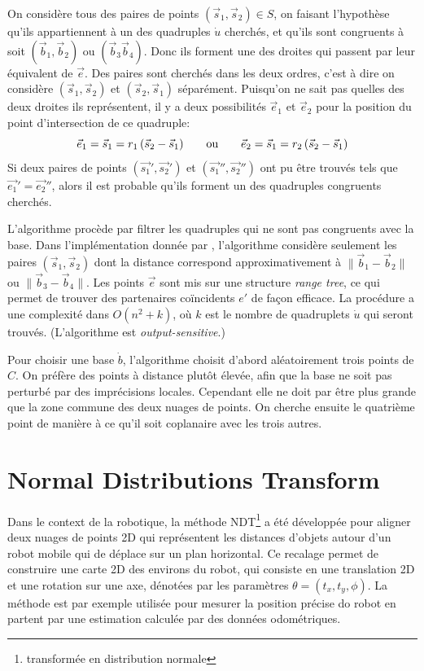\documentclass[a4paper,10pt]{scrreprt}
\begin{document}
On considère tous des paires de points $(\vec{s}_1, \vec{s}_2) \in S$, on faisant l'hypothèse qu'ils appartiennent à un des quadruples $\dot{u}$ cherchés, et qu'ils sont congruents à soit $(\vec{b}_1, \vec{b}_2)$ ou $(\vec{b}_3 \vec{b}_4)$. Donc ils forment une des droites qui passent par leur équivalent de $\vec{e}$. Des paires sont cherchés dans les deux ordres, c'est à dire on considère $(\vec{s}_1, \vec{s}_2)$ et $(\vec{s}_2, \vec{s}_1)$ séparément. Puisqu'on ne sait pas quelles des deux droites ils représentent, il y a deux possibilités $\vec{e}_1$ et $\vec{e}_2$ pour la position du point d'intersection de ce quadruple:
\begin{equation*}
	\vec{e}_1 = \vec{s}_1 = r_1 \, (\vec{s}_2 - \vec{s}_1)
	\hspace{7mm} \text{ou} \hspace{7mm}
	\vec{e}_2 = \vec{s}_1 = r_2 \, (\vec{s}_2 - \vec{s}_1)	
\end{equation*}
Si deux paires de points $(\vec{s_1}', \vec{s_2}')$ et $(\vec{s_1}'', \vec{s_2}'')$ ont pu être trouvés tels que $\vec{e_1}' = \vec{e_2}''$, alors il est probable qu'ils forment un des quadruples congruents cherchés.

L'algorithme procède par filtrer les quadruples qui ne sont pas congruents avec la base. Dans l'implémentation donnée par \cite{Aige2008}, l'algorithme considère seulement les paires $(\vec{s}_1, \vec{s}_2)$ dont la distance correspond approximativement à $\| \vec{b}_1 - \vec{b}_2 \|$ ou $\| \vec{b}_3 - \vec{b}_4 \|$. Les points $\vec{e}$ sont mis sur une structure \emph{range tree}, ce qui permet de trouver des partenaires coïncidents $e'$ de façon efficace. La procédure a une complexité dans $O(n^2 + k)$, où $k$ est le nombre de quadruplets $\dot{u}$ qui seront trouvés. (L'algorithme est \emph{output-sensitive}.)

Pour choisir une base $\dot{b}$, l'algorithme choisit d'abord aléatoirement trois points de $C$. On préfère des points à distance plutôt élevée, afin que la base ne soit pas perturbé par des imprécisions locales. Cependant elle ne doit par être plus grande que la zone commune des deux nuages de points. On cherche ensuite le quatrième point de manière à ce qu'il soit coplanaire avec les trois autres.



\section{Normal Distributions Transform}
Dans le context de la robotique, la méthode NDT\footnote{transformée en distribution normale} a été développée pour aligner deux nuages de points 2D qui représentent les distances d'objets autour d'un robot mobile qui de déplace sur un plan horizontal. \cite{Bibe2003} Ce recalage permet de construire une carte 2D des environs du robot, qui consiste en une translation 2D et une rotation sur une axe, dénotées par les paramètres $\theta = (t_x, t_y, \phi)$. La méthode est par exemple utilisée pour mesurer la position précise do robot en partent par une estimation calculée par des données odométriques.
\end{document}
